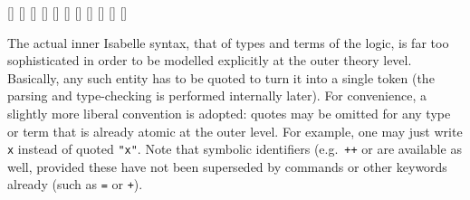 \begin{isabellebody}
\begin{isamarkuptext}
  \begin{railoutput}
[]
\rail@bar
{}
\rail@bar
{}[]
[]
\rail@endbar
\rail@plus
{}[]
[]
\rail@endplus
\rail@endbar
\rail@end
{}
[]
\rail@end
{}
\rail@bar
{}
[]
\rail@plus
{}[]
[]
\rail@endplus
{}[]
\rail@endbar
{}[]
\rail@end
\end{railoutput}%
\end{isamarkuptext}%
\isamarkuptrue%
%
\isamarkuptrue%
%
\begin{isamarkuptext}%
The actual inner Isabelle syntax, that of types and terms of the
  logic, is far too sophisticated in order to be modelled explicitly
  at the outer theory level.  Basically, any such entity has to be
  quoted to turn it into a single token (the parsing and type-checking
  is performed internally later).  For convenience, a slightly more
  liberal convention is adopted: quotes may be omitted for any type or
  term that is already atomic at the outer level.  For example, one
  may just write \verb|x| instead of quoted \verb|"x"|.
  Note that symbolic identifiers (e.g.\ \verb|++| or  are available as well, provided these have not been superseded
  by commands or other keywords already (such as \verb|=| or
  \verb|+|).


\end{isamarkuptext}
\end{isabellebody}
